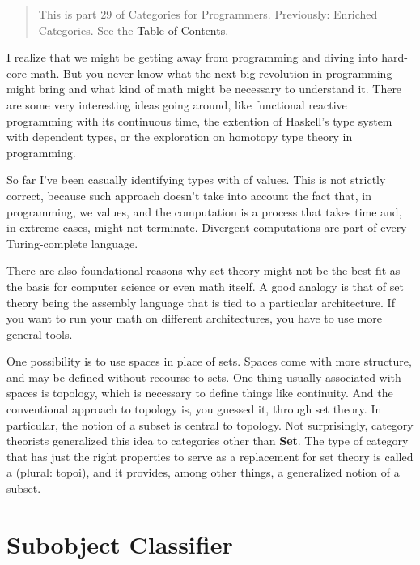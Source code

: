 \begin{quote}
This is part 29 of Categories for Programmers. Previously: {Enriched
Categories}. See the
\href{https://bartoszmilewski.com/2014/10/28/category-theory-for-programmers-the-preface/}{Table
of Contents}.
\end{quote}

I realize that we might be getting away from programming and diving into
hard-core math. But you never know what the next big revolution in
programming might bring and what kind of math might be necessary to
understand it. There are some very interesting ideas going around, like
functional reactive programming with its continuous time, the extention
of Haskell's type system with dependent types, or the exploration on
homotopy type theory in programming.

So far I've been casually identifying types with  of values.
This is not strictly correct, because such approach doesn't take into
account the fact that, in programming, we  values, and the
computation is a process that takes time and, in extreme cases, might
not terminate. Divergent computations are part of every Turing-complete
language.

There are also foundational reasons why set theory might not be the best
fit as the basis for computer science or even math itself. A good
analogy is that of set theory being the assembly language that is tied
to a particular architecture. If you want to run your math on different
architectures, you have to use more general tools.

One possibility is to use spaces in place of sets. Spaces come with more
structure, and may be defined without recourse to sets. One thing
usually associated with spaces is topology, which is necessary to define
things like continuity. And the conventional approach to topology is,
you guessed it, through set theory. In particular, the notion of a
subset is central to topology. Not surprisingly, category theorists
generalized this idea to categories other than \textbf{Set}. The type of
category that has just the right properties to serve as a replacement
for set theory is called a  (plural: topoi), and it
provides, among other things, a generalized notion of a subset.

\section{Subobject Classifier}\label{subobject-classifier}

